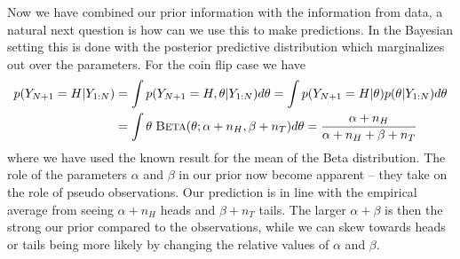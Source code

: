 Now we have combined  our prior information with the information from data, a natural
next question is how can we use this to make predictions.  In the Bayesian setting
this is done with the posterior predictive distribution which marginalizes out over
the parameters.  For the coin flip case we have
\begin{align}
\label{eq:bayes:post-pred}
p( Y_{N+1}=H | Y_{1:N}) &= \int p(Y_{N+1}=H, \theta | Y_{1:N}) d\theta
= \int p(Y_{N+1}=H | \theta) p(\theta | Y_{1:N})  d\theta \nonumber \\
&= \int  \theta \; \textsc{Beta}(\theta ; \alpha+n_H, \beta+n_T) d\theta 
=\frac{\alpha+n_H}{\alpha+n_H+\beta+n_T}
\end{align}
where we have used the known result for the mean of the Beta distribution.
The role of the parameters $\alpha$ and $\beta$ in our prior now become apparent
-- they take on the role of pseudo observations.  Our prediction is in line with the
empirical average from seeing $\alpha+n_H$ heads and $\beta+n_T$ tails.  The larger
$\alpha+\beta$ is then the strong our prior compared to the observations, while we
can skew towards heads or tails being more likely by changing the relative values of $\alpha$
and $\beta$.

